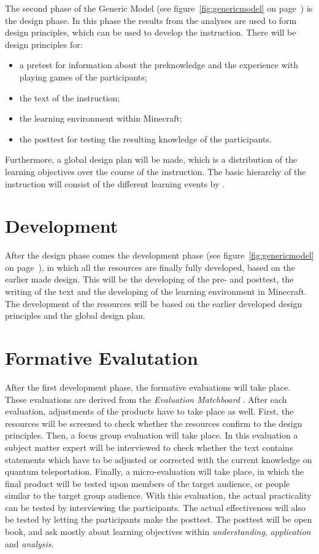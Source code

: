 \documentclass[12pt]{report} %
\begin{document}
The second phase of the Generic Model \cite{genericmodel} (see figure~\ref{fig:genericmodel} on page~\pageref{fig:genericmodel}) is the design phase. In this phase the results from the analyses are used to form design principles, which can be used to develop the instruction. There will be design principles for:
\begin{itemize}
\item a pretest for information about the preknowledge and the experience with playing games of the participants;
\item the text of the instruction;
\item the learning environment within Minecraft;
\item the posttest for testing the resulting knowledge of the participants.
\end{itemize}
Furthermore, a global design plan will be made, which is a distribution of the learning objectives over the course of the instruction. The basic hierarchy of the instruction will consist of the different learning events by .

\section{Development}

After the design phase comes the development phase \cite{genericmodel} (see figure~\ref{fig:genericmodel} on page~\pageref{fig:genericmodel}), in which all the resources are finally fully developed, based on the earlier made design. This will be the developing of the pre- and posttest, the writing of the text and the developing of the learning environment in Minecraft. The development of the resources will be based on the earlier developed design principles and the global design plan.

\section{Formative Evalutation}

After the first development phase, the formative evaluations will take place. These evaluations are derived from the \emph{Evaluation Matchboard} \cite{evamatchboard}. After each evaluation, adjustments of the products have to take place as well. First, the resources will be screened to check whether the resources confirm to the design principles. Then, a focus group evaluation will take place. In this evaluation a subject matter expert will be interviewed to check whether the text contains statements which have to be adjusted or corrected with the current knowledge on quantum teleportation. Finally, a micro-evaluation will take place, in which the final product will be tested upon members of the target audience, or people similar to the target group audience. With this evaluation, the actual practicality can be tested by interviewing the participants. The actual effectiveness will also be tested by letting the participants make the posttest. The posttest will be open book, and ask mostly about learning objectives within \emph{understanding}, \emph{application} and \emph{analysis}.
\end{document}
